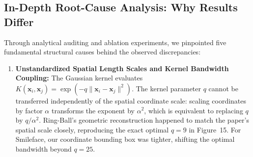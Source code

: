 \subsection{In-Depth Root-Cause Analysis: Why Results Differ}
\label{subsec:svstream_discrepancies}

Through analytical auditing and ablation experiments, we pinpointed five fundamental structural causes behind the observed discrepancies:

\begin{enumerate}[label=\textbf{\arabic*.}]
  \item \textbf{Unstandardized Spatial Length Scales and Kernel Bandwidth Coupling:}
  The Gaussian kernel evaluates $K(\mathbf{x}_i, \mathbf{x}_j) = \exp(-q \|\mathbf{x}_i - \mathbf{x}_j\|^2)$. The kernel parameter $q$ cannot be transferred independently of the spatial coordinate scale: scaling coordinates by factor $\alpha$ transforms the exponent by $\alpha^2$, which is equivalent to replacing $q$ by $q/\alpha^2$. Ring-Ball's geometric reconstruction happened to match the paper's spatial scale closely, reproducing the exact optimal $q=9$ in Figure~15. For Smileface, our coordinate bounding box was tighter, shifting the optimal bandwidth beyond $q=25$.


\end{enumerate}
